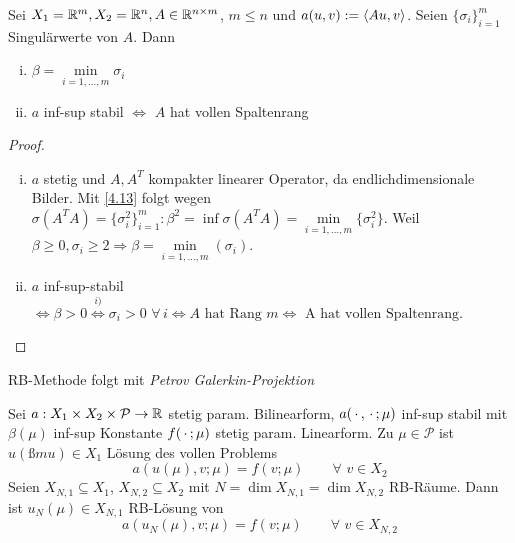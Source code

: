 \begin{kor}
Sei $X_1 = \mathbb{R}^m, X_2 = \mathbb{R}^n, A \in \mathbb{R}^{n \times m}$, $m \leq n$ und $a(u,v) := \langle Au, v \rangle$. Seien $\{\sigma_i\}_{i=1}^m$ Singulärwerte von $A$. Dann
\begin{enumerate}[i)]
	\item $\beta = \min\limits_{i=1,\dots,m} \sigma_i$
	\item $a$ inf-sup stabil $\iff$ $A$ hat vollen Spaltenrang
\end{enumerate}
\begin{proof}
\begin{enumerate}[i)]
	\item $a$ stetig und $A, A^T$ kompakter linearer Operator, da endlichdimensionale  Bilder. Mit \ref{4.13} folgt wegen $\sigma(A^TA) = \{\sigma_i^2\}_{i=1}^m : \beta^2 = \inf \sigma(A^TA) = \min\limits_{i=1,\dots,m} \{\sigma_i^2\}$. Weil $\beta \geq 0, \sigma_i \geq 2 \Rightarrow \beta = \min\limits_{i=1,\dots,m} (\sigma_i)$.
	\item $a$ inf-sup-stabil $\iff \beta > 0 \overset{i)}{\iff} \sigma_i > 0 \,\, \forall \, i \iff A \text{ hat Rang } m \iff \text{ A hat vollen Spaltenrang.}$
\end{enumerate}
\end{proof}
\end{kor}

RB-Methode folgt mit \emph{Petrov Galerkin-Projektion}

\begin{defn} \label{4.15}
Sei $a: X_1 \times X_2 \times \mathcal{P} \rightarrow \mathbb{R}$ stetig param. Bilinearform, $a(\,\cdot\,,\,\cdot\,;\mu)$ inf-sup stabil mit $\beta(\mu)$ inf-sup Konstante $f(\,\cdot\,;\mu)$ stetig param. Linearform. Zu $\mu \in \mathcal{P}$ ist $u(ßmu) \in X_1$ Lösung des vollen Problems
\[
	a(u(\mu),v;\mu) = f(v;\mu) \qquad \forall \,\, v \in X_2
\]
Seien $X_{N,1} \subseteq X_1$, $X_{N,2} \subseteq X_2$ mit $N = \dim X_{N,1} = \dim X_{N,2}$ RB-Räume. Dann ist $u_N (\mu) \in X_{N,1}$ RB-Lösung von
\[
	a(u_N(\mu),v;\mu) = f(v;\mu) \qquad \forall \,\, v \in X_{N,2}
\]
\end{defn}

